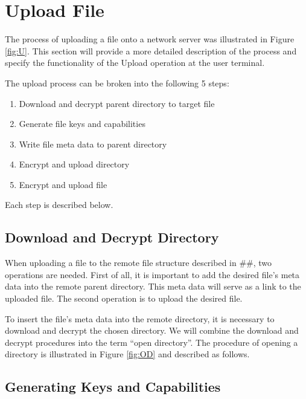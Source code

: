\documentclass[english,12pt,a4paper]{book}
\begin{document}
\section{Upload File}
The process of uploading a file onto a network server was illustrated in Figure
\ref{fig:U}. This section will provide a more detailed description of the
process and specify the functionality of the Upload operation at the user
terminal.

The upload process can be broken into the following 5 steps:

\begin{enumerate}
\item Download and decrypt parent directory to target file
\item Generate file keys and capabilities
\item Write file meta data to parent directory
\item Encrypt and upload directory
\item Encrypt and upload file
\end{enumerate}

Each step is described below.

\subsection{Download and Decrypt Directory}
When uploading a file to the remote file structure described in \#\#, two
operations are needed. First of all, it is important to add the desired file's
meta data into the remote parent directory. This meta data will serve as a link
to the uploaded file. The second operation is to upload the desired file.

To insert the file's meta data into the remote directory, it is necessary to
download and decrypt the chosen directory. We will combine the download and
decrypt procedures into the term ``open directory''. The procedure of opening a
directory is illustrated in Figure \ref{fig:OD} and described as follows.



\subsection{Generating Keys and Capabilities}
\end{document}
